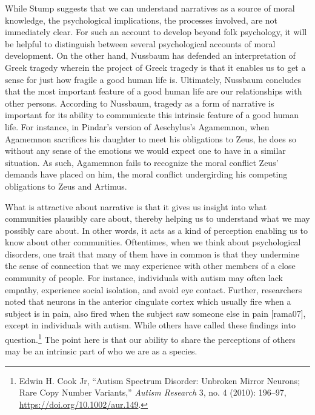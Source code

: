 \documentclass[phdthesis,12pt,final]{wuthesis}
\theoremstyle{definition}
\theoremstyle{definition}
\theoremstyle{definition}
\theoremstyle{definition}
\theoremstyle{remark}
\begin{document}
While Stump suggests that we can understand narratives as a source of moral knowledge, the psychological implications, the processes involved, are not immediately clear. For such an account to develop beyond folk psychology, it will be helpful to distinguish between several psychological accounts of moral development. On the other hand, Nussbaum has defended an interpretation of Greek tragedy wherein the project of Greek tragedy is that it enables us to get a sense for just how fragile a good human life is. Ultimately, Nussbaum concludes that the most important feature of a good human life are our relationships with other persons. According to Nussbaum, tragedy as a form of narrative is important for its ability to communicate this intrinsic feature of a good human life. For instance, in Pindar's version of Aeschylus's Agamemnon, when Agamemnon sacrifices his daughter to meet his obligations to Zeus, he does so without any sense of the emotions we would expect one to have in a similar situation. As such, Agamemnon fails to recognize the moral conflict Zeus' demands have placed on him, the moral conflict undergirding his competing obligations to Zeus and Artimus.

What is attractive about narrative is that it gives us insight into what communities plausibly care about, thereby helping us to understand what we may possibly care about. In other words, it acts as a kind of perception enabling us to know about other communities. Oftentimes, when we think about psychological disorders, one trait that many of them have in common is that they undermine the sense of connection that we may experience with other members of a close community of people. For instance, individuals with autism may often lack empathy, experience social isolation, and avoid eye contact. Further, researchers noted that neurons in the anterior cingulate cortex which usually fire when a subject is in pain, also fired when the subject saw someone else in pain {[}rama07{]}, except in individuals with autism. While others have called these findings into question.\footnote{Edwin H. Cook Jr, {``Autism Spectrum Disorder: Unbroken Mirror Neurons; Rare Copy Number Variants,''} \emph{Autism Research} 3, no. 4 (2010): 196--97, \url{https://doi.org/10.1002/aur.149}.} The point here is that our ability to share the perceptions of others may be an intrinsic part of who we are as a species.
\end{document}
